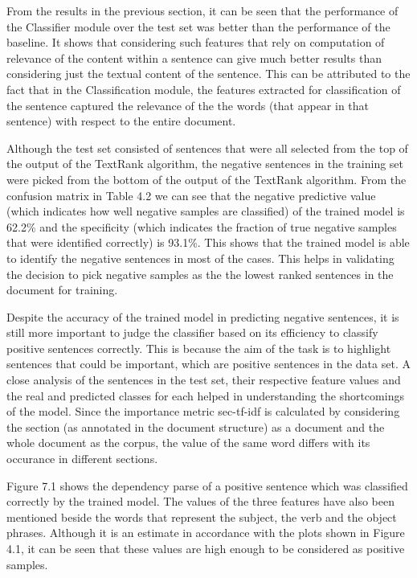 From the results in the previous section, it can be seen that the performance of the Classifier module over the test set was better than the performance of the baseline.
It shows that considering such features that rely on computation of relevance of the content within a sentence can give much better results than considering just the textual content of the sentence.
This can be attributed to the fact that in the Classification module, the features extracted for classification of the sentence captured the relevance of the the words (that appear in that sentence) with respect to the entire document.

Although the test set consisted of sentences that were all selected from the top of the output of the TextRank algorithm, the negative sentences in the training set were picked from the bottom of the output of the TextRank algorithm.
From the confusion matrix in Table 4.2 we can see that the negative predictive value (which indicates how well negative samples are classified) of the trained model is 62.2\% and the specificity (which indicates the fraction of true negative samples that were identified correctly) is 93.1\%.
This shows that the trained model is able to identify the negative sentences in most of the cases.
This helps in validating the decision to pick negative samples as the the lowest ranked sentences in the document for training.

Despite the accuracy of the trained model in predicting negative sentences, it is still more important to judge the classifier based on its efficiency to classify positive sentences correctly.
This is because the aim of the task is to highlight sentences that could be important, which are positive sentences in the data set.
A close analysis of the sentences in the test set, their respective feature values and the real and predicted classes for each helped in understanding the shortcomings of the model.
Since the importance metric sec-tf-idf is calculated by considering the section (as annotated in the document structure) as a document and the whole document as the corpus, the value of the same word differs with its occurance in different sections.

Figure 7.1 shows the dependency parse of a positive sentence which was classified correctly by the trained model.
The values of the three features have also been mentioned beside the words that represent the subject, the verb and the object phrases.
Although it is an estimate in accordance with the plots shown in Figure 4.1, it can be seen that these values are high enough to be considered as positive samples.

